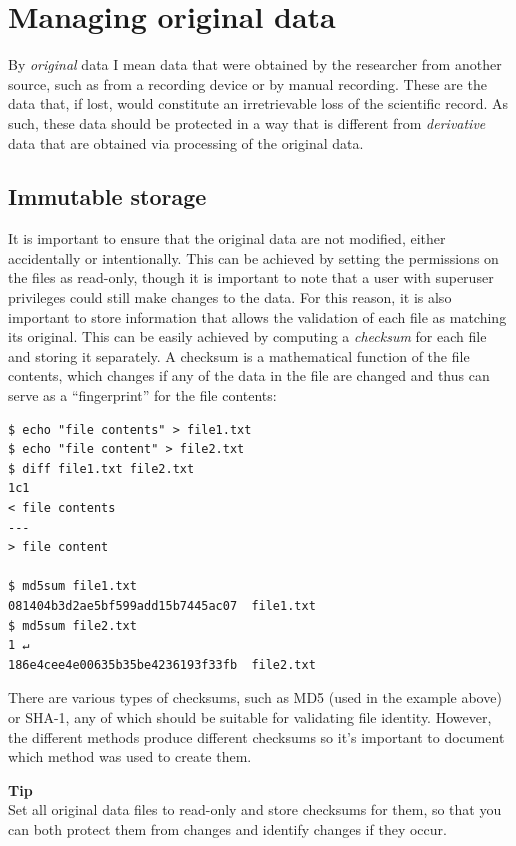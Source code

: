 \section{Managing original data}

By \textit{original} data I mean data that were obtained by the researcher from another source, such as from a recording device or by manual recording.  These are the data that, if lost, would constitute an irretrievable loss of the scientific record. As such, these data should be protected in a way that is different from \textit{derivative} data that are obtained via processing of the original data.

\subsection{Immutable storage}

It is important to ensure that the original data are not modified, either accidentally or intentionally.  This can be achieved by setting the permissions on the files as read-only, though it is important to note that a user with superuser privileges could still make changes to the data.  For this reason, it is also important to store information that allows the validation of each file as matching its original.  This can be easily achieved by computing a \textit{checksum} for each file and storing it separately. A checksum is a mathematical function of the file contents, which changes if any of the data in the file are changed and thus can serve as a ``fingerprint'' for the file contents:

\begin{lstlisting}[style=shell]
$ echo "file contents" > file1.txt
$ echo "file content" > file2.txt
$ diff file1.txt file2.txt
1c1
< file contents
---
> file content

$ md5sum file1.txt
081404b3d2ae5bf599add15b7445ac07  file1.txt
$ md5sum file2.txt                                                       1 ↵
186e4cee4e00635b35be4236193f33fb  file2.txt
\end{lstlisting}

There are various types of checksums, such as MD5 (used in the example above) or SHA-1, any of which should be suitable for validating file identity.  However, the different methods produce different checksums so it's important to document which method was used to create them.

\begin{framed}
\textbf{Tip}\\
Set all original data files to read-only and store checksums for them, so that you can both protect them from changes and identify changes if they occur.
\end{framed}
